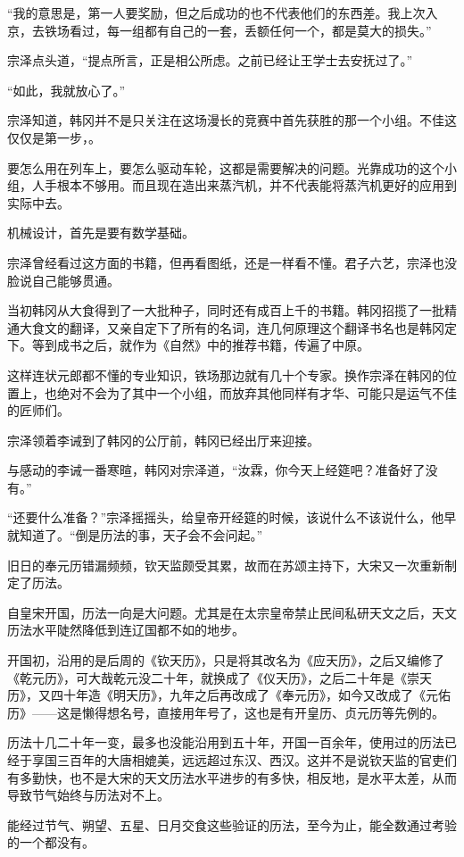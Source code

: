 “我的意思是，第一人要奖励，但之后成功的也不代表他们的东西差。我上次入京，去铁场看过，每一组都有自己的一套，丢额任何一个，都是莫大的损失。”

宗泽点头道，“提点所言，正是相公所虑。之前已经让王学士去安抚过了。”

“如此，我就放心了。”

宗泽知道，韩冈并不是只关注在这场漫长的竞赛中首先获胜的那一个小组。不佳这仅仅是第一步，。

要怎么用在列车上，要怎么驱动车轮，这都是需要解决的问题。光靠成功的这个小组，人手根本不够用。而且现在造出来蒸汽机，并不代表能将蒸汽机更好的应用到实际中去。

机械设计，首先是要有数学基础。

宗泽曾经看过这方面的书籍，但再看图纸，还是一样看不懂。君子六艺，宗泽也没脸说自己能够贯通。

当初韩冈从大食得到了一大批种子，同时还有成百上千的书籍。韩冈招揽了一批精通大食文的翻译，又亲自定下了所有的名词，连几何原理这个翻译书名也是韩冈定下。等到成书之后，就作为《自然》中的推荐书籍，传遍了中原。

这样连状元郎都不懂的专业知识，铁场那边就有几十个专家。换作宗泽在韩冈的位置上，也绝对不会为了其中一个小组，而放弃其他同样有才华、可能只是运气不佳的匠师们。

宗泽领着李诫到了韩冈的公厅前，韩冈已经出厅来迎接。

与感动的李诫一番寒暄，韩冈对宗泽道，“汝霖，你今天上经筵吧？准备好了没有。”

“还要什么准备？”宗泽摇摇头，给皇帝开经筵的时候，该说什么不该说什么，他早就知道了。“倒是历法的事，天子会不会问起。”

旧日的奉元历错漏频频，钦天监颇受其累，故而在苏颂主持下，大宋又一次重新制定了历法。

自皇宋开国，历法一向是大问题。尤其是在太宗皇帝禁止民间私研天文之后，天文历法水平陡然降低到连辽国都不如的地步。

开国初，沿用的是后周的《钦天历》，只是将其改名为《应天历》，之后又编修了《乾元历》，可大哉乾元没二十年，就换成了《仪天历》，之后二十年是《崇天历》，又四十年造《明天历》，九年之后再改成了《奉元历》，如今又改成了《元佑历》——这是懒得想名号，直接用年号了，这也是有开皇历、贞元历等先例的。

历法十几二十年一变，最多也没能沿用到五十年，开国一百余年，使用过的历法已经于享国三百年的大唐相媲美，远远超过东汉、西汉。这并不是说钦天监的官吏们有多勤快，也不是大宋的天文历法水平进步的有多快，相反地，是水平太差，从而导致节气始终与历法对不上。

能经过节气、朔望、五星、日月交食这些验证的历法，至今为止，能全数通过考验的一个都没有。

